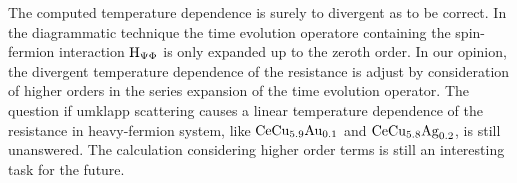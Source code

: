The computed temperature dependence is surely to divergent as to be correct.
In the diagrammatic technique the time evolution operatore containing the spin-fermion interaction $\mathrm{H}_{\Psi\Phi}$ is only expanded up to the zeroth order.
In our opinion, the divergent temperature dependence of the resistance is adjust by consideration of higher orders in the series expansion of the time evolution operator.
The question if umklapp scattering causes a linear temperature dependence of the resistance in heavy-fermion system, like $\mathrm{CeCu}_{5.9}\mathrm{Au}_{0.1}$ and $\mathrm{CeCu}_{5.8}\mathrm{Ag}_{0.2}$, is still unanswered.
The calculation considering higher order terms is still an interesting task for the future.














